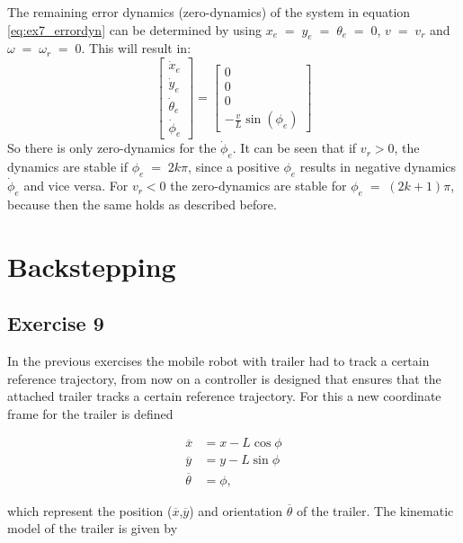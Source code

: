 The remaining error dynamics (zero-dynamics) of the system in equation \eqref{eq:ex7_errordyn} can be determined by using $x_e\;=\;y_e\;=\;\theta_e\;=\;
0$, $v\;=\;v_r$ and $\omega\;=\;\omega_r\;=\;0$. This will result in:
\begin{equation}
    \begin{bmatrix}
    \dot{x}_e \\
    \dot{y}_e \\
    \dot{\theta}_e \\
    \dot{\phi}_e
    \end{bmatrix}
    =
    \begin{bmatrix}
    0 \\
    0 \\
    0 \\
    - \frac{v}{L}\sin(\phi_e)
    \end{bmatrix}
    \label{eq:ex8_zero}
\end{equation}
So there is only zero-dynamics for the $\dot{\phi}_e$. It can be seen that if $v_r>0$, the dynamics are stable if $\phi_e\;=\;2 k \pi$, since a positive $\phi_e$ results in negative dynamics $\dot{\phi}_e$ and vice versa. For $v_r < 0$ the zero-dynamics are stable for $\phi_e\;=\;(2k + 1) \pi$, because then the same holds as described before.


\section{Backstepping}


\subsection{Exercise 9}
In the previous exercises the mobile robot with trailer had to track a certain reference trajectory, from now on a controller is designed that ensures that the attached trailer tracks a certain reference trajectory. For this a new coordinate frame for the trailer is defined

\begin{align}
\overline{x} &= x - L \cos{\phi} \label{eq:ex9_trailercoords_a}\\
\overline{y} &= y - L \sin{\phi} \label{eq:ex9_trailercoords_b}\\
\overline{\theta} &= \phi,
\label{eq:ex9_trailercoords_c}
\end{align}

which represent the position ($\overline{x}$,$\overline{y}$) and orientation $\overline{\theta}$ of the trailer. The kinematic model of the trailer is given by

